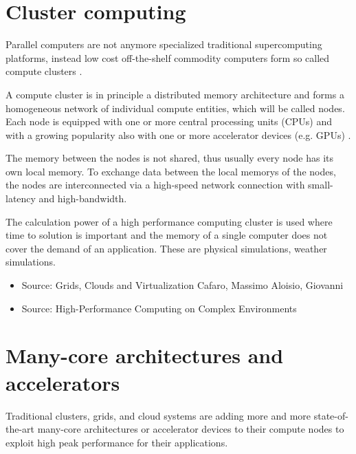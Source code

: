 \section{Cluster computing}
\label{sec:cluster}
Parallel computers are not anymore specialized traditional
supercomputing platforms, instead low cost off-the-shelf commodity
computers form so called compute clusters \cite{ref:hpcc1}.

A compute cluster is in principle a distributed memory architecture
and forms a homogeneous network of individual compute entities, which
will be called nodes. Each node is equipped with one or more central
processing units (CPUs) and with a growing popularity also with one or
more accelerator devices (e.g. GPUs) \cite{ref:accel}.

The memory between the nodes is not shared, thus usually every node
has its own local memory. To exchange data between the local memorys
of the nodes, the nodes are interconnected via a high-speed network
connection with small-latency and high-bandwidth.

The calculation power of a high performance computing cluster
is used where time to solution is important and the memory
of a single computer does not cover the demand of an application. These are
physical simulations\cite{ref:picongpu}, weather simulations.

\begin{itemize}
  \item Source: Grids, Clouds and Virtualization Cafaro, Massimo Aloisio, Giovanni
  \item Source: High-Performance Computing on Complex Environments
\end{itemize}

\section{Many-core architectures and accelerators}
\label{sec:accel}

Traditional clusters, grids, and cloud systems are adding more and
more state-of-the-art many-core architectures or accelerator devices
to their compute nodes to exploit high peak performance for their applications.

